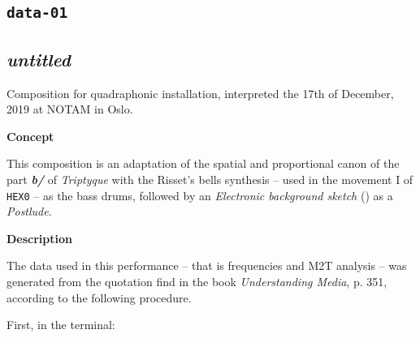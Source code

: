 \documentclass{book}
\begin{document}
\bigskip
\bigskip

\begin{mdframed}[style=stylesec]
\section{\texttt{data-01}}
\label{d01}
\smallskip
\end{mdframed}


\begin{mdframed}[style=stylesec]
\section{\textit{untitled}}
\label{scp}
\smallskip
\end{mdframed}

\bigskip

Composition for quadraphonic installation, interpreted the 17th of December, 2019 at NOTAM in Oslo.

\bigskip

\noindent \textbf{{\large Concept}}
\hrulefill

\bigskip

This composition is an adaptation of the spatial and proportional canon of  the part \textbf{\textit{b/}}
of \textsl{Triptyque} with the Risset's bells synthesis -- used in the movement I of \texttt{HEX0} -- as the bass drums, followed by an \textsl{Electronic background sketch} () as a \textit{Postlude}.

\smallskip
\bigskip

\noindent \textbf{{\large Description}}
\hrulefill

\bigskip

The data used in this performance -- that is frequencies and M2T analysis --  was generated from the quotation find in the book \textit{Understanding Media}, \citep{mm} p. 351, according to the following procedure.

\bigskip

First, in the terminal:
\end{document}
